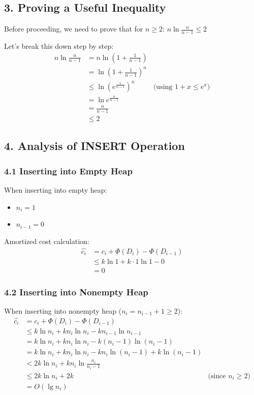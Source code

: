\documentclass[11pt]{article}
\theoremstyle{definition}
\begin{document}
\subsection*{3. Proving a Useful Inequality}
Before proceeding, we need to prove that for $n \geq 2$: $n \ln \frac{n}{n-1} \leq 2$

Let's break this down step by step:
\begin{align*}
n \ln \frac{n}{n-1} &= n \ln \left(1 + \frac{1}{n-1}\right) \\
&= \ln \left(1 + \frac{1}{n-1}\right)^n \\
&\leq \ln \left(e^{\frac{1}{n-1}}\right)^n & \text{(using } 1 + x \leq e^x\text{)} \\
&= \ln e^{\frac{n}{n-1}} \\
&= \frac{n}{n-1} \\
&\leq 2
\end{align*}

\subsection*{4. Analysis of INSERT Operation}

\subsubsection*{4.1 Inserting into Empty Heap}
When inserting into empty heap:
\begin{itemize}
  \item $n_i = 1$
  \item $n_{i-1} = 0$
\end{itemize}

Amortized cost calculation:
\begin{align*}
\hat{c_i} &= c_i + \Phi(D_i) - \Phi(D_{i-1}) \\
&\leq k \ln 1 + k \cdot 1 \ln 1 - 0 \\
&= 0
\end{align*}

\subsubsection*{4.2 Inserting into Nonempty Heap}
When inserting into nonempty heap ($n_i = n_{i-1} + 1 \geq 2$):
\begin{align*}
\hat{c_i} &= c_i + \Phi(D_i) - \Phi(D_{i-1}) \\
&\leq k \ln n_i + kn_i \ln n_i - kn_{i-1} \ln n_{i-1} \\
&= k \ln n_i + kn_i \ln n_i - k(n_i - 1)\ln(n_i - 1) \\
&= k \ln n_i + kn_i \ln n_i - kn_i \ln(n_i - 1) + k \ln(n_i - 1) \\
&< 2k \ln n_i + kn_i \ln \frac{n_i}{n_i - 1} \\
&\leq 2k \ln n_i + 2k & \text{(since } n_i \geq 2\text{)} \\
&= O(\lg n_i)
\end{align*}
\end{document}
